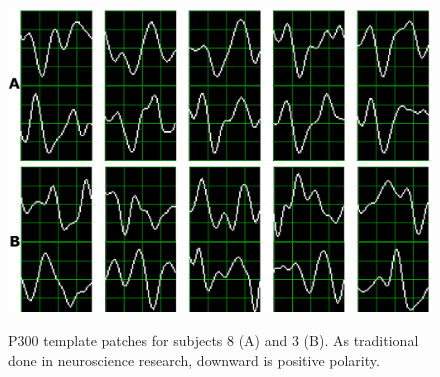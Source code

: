 \documentclass[utf8]{frontiersSCNS} %
\begin{document}
\begin{figure}[h!]
\centering
\includegraphics[width=15cm]{subject.png}\label{subject8}
\caption{P300 template patches for subjects 8 (A) and 3 (B). As traditional done in neuroscience research, downward is positive polarity. }
\label{fig:p300templates}
\end{figure}
\end{document}
